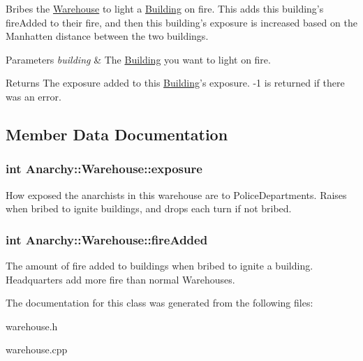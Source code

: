 Bribes the \hyperlink{classAnarchy_1_1Warehouse}{Warehouse} to light a \hyperlink{classAnarchy_1_1Building}{Building} on fire. This adds this building's fire\-Added to their fire, and then this building's exposure is increased based on the Manhatten distance between the two buildings. 


\begin{DoxyParams}{Parameters}
{\em building} & The \hyperlink{classAnarchy_1_1Building}{Building} you want to light on fire.\\
\hline
\end{DoxyParams}
\begin{DoxyReturn}{Returns}
The exposure added to this \hyperlink{classAnarchy_1_1Building}{Building}'s exposure. -\/1 is returned if there was an error.
\end{DoxyReturn}


\subsection{Member Data Documentation}
\hypertarget{classAnarchy_1_1Warehouse_a98c01b33a1a27d2d2e47a33d3ed9dc06}{
\subsubsection[{exposure}]{\setlength{\rightskip}{0pt plus 5cm}int Anarchy\-::\-Warehouse\-::exposure}}\label{classAnarchy_1_1Warehouse_a98c01b33a1a27d2d2e47a33d3ed9dc06}


How exposed the anarchists in this warehouse are to Police\-Departments. Raises when bribed to ignite buildings, and drops each turn if not bribed. 

\hypertarget{classAnarchy_1_1Warehouse_a646bc6f8bbd539ea88b9b68593b6f5b7}{
\subsubsection[{fire\-Added}]{\setlength{\rightskip}{0pt plus 5cm}int Anarchy\-::\-Warehouse\-::fire\-Added}}\label{classAnarchy_1_1Warehouse_a646bc6f8bbd539ea88b9b68593b6f5b7}


The amount of fire added to buildings when bribed to ignite a building. Headquarters add more fire than normal Warehouses. 



The documentation for this class was generated from the following files\-:\begin{DoxyCompactItemize}
\item 
warehouse.\-h\item 
warehouse.\-cpp\end{DoxyCompactItemize}

